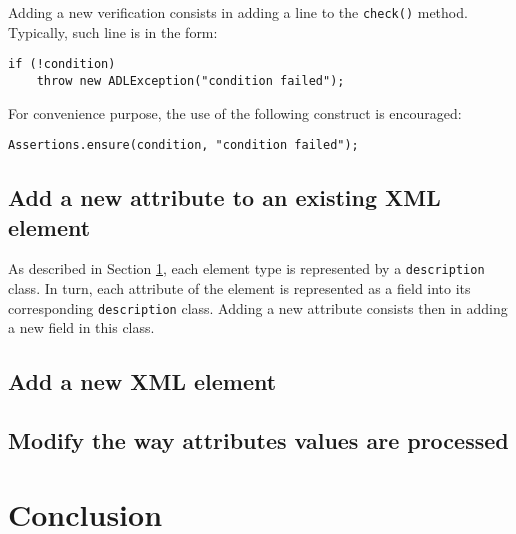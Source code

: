 \documentclass{article}
\newcommand{\code}[1]{\texttt{#1}}
\begin{document}
Adding a new verification consists in adding a line to the \code{check()} method. Typically, such line
is in the form:

\begin{lstlisting}
if (!condition)
	throw new ADLException("condition failed");
\end{lstlisting}

For convenience purpose, the use of the following construct is encouraged:

\begin{lstlisting}
Assertions.ensure(condition, "condition failed");
\end{lstlisting}



\subsection{Add a new attribute to an existing XML element}

As described in Section \ref{}, each element type is represented by a \code{description} class.
In turn, each attribute of the element is represented as a field into its corresponding \code{description} class.
Adding a new attribute consists then in adding a new field in this class.

\subsection{Add a new XML element}

\subsection{Modify the way attributes values are processed}


\section{Conclusion}
\end{document}
